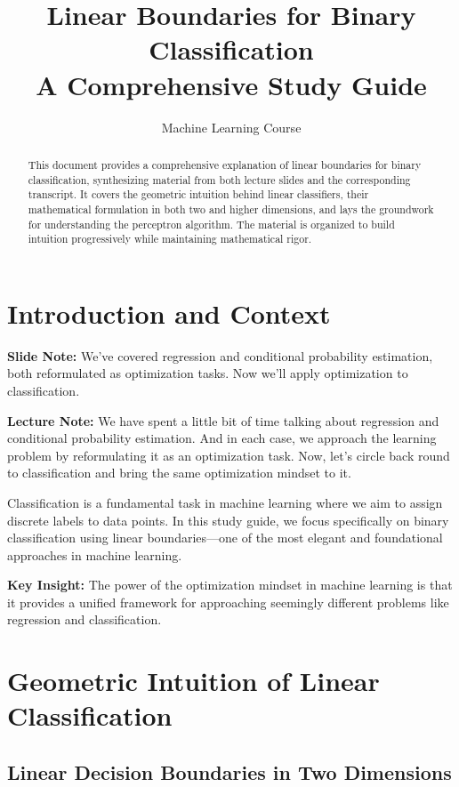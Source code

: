 \documentclass{article}
\title{Linear Boundaries for Binary Classification\\
\large A Comprehensive Study Guide}
\author{Machine Learning Course}
\date{}
\newcommand{\slidenote}[1]{\begin{mdframed}[backgroundcolor=blue!10, linewidth=0pt]
\textbf{Slide Note:} #1
\end{mdframed}}
\newcommand{\lecturenote}[1]{\begin{mdframed}[backgroundcolor=green!10, linewidth=0pt]
\textbf{Lecture Note:} #1
\end{mdframed}}
\newcommand{\insight}[1]{\begin{mdframed}[backgroundcolor=yellow!10, linewidth=0pt]
\textbf{Key Insight:} #1
\end{mdframed}}
\begin{document}
\maketitle

\begin{abstract}
This document provides a comprehensive explanation of linear boundaries for binary classification, synthesizing material from both lecture slides and the corresponding transcript. It covers the geometric intuition behind linear classifiers, their mathematical formulation in both two and higher dimensions, and lays the groundwork for understanding the perceptron algorithm. The material is organized to build intuition progressively while maintaining mathematical rigor.
\end{abstract}

\tableofcontents

\section{Introduction and Context}

\slidenote{We've covered regression and conditional probability estimation, both reformulated as optimization tasks. Now we'll apply optimization to classification.}

\lecturenote{We have spent a little bit of time talking about regression and conditional probability estimation. And in each case, we approach the learning problem by reformulating it as an optimization task. Now, let's circle back round to classification and bring the same optimization mindset to it.}

Classification is a fundamental task in machine learning where we aim to assign discrete labels to data points. In this study guide, we focus specifically on binary classification using linear boundaries—one of the most elegant and foundational approaches in machine learning.

\insight{The power of the optimization mindset in machine learning is that it provides a unified framework for approaching seemingly different problems like regression and classification.}

\section{Geometric Intuition of Linear Classification}

\subsection{Linear Decision Boundaries in Two Dimensions}
\end{document}
